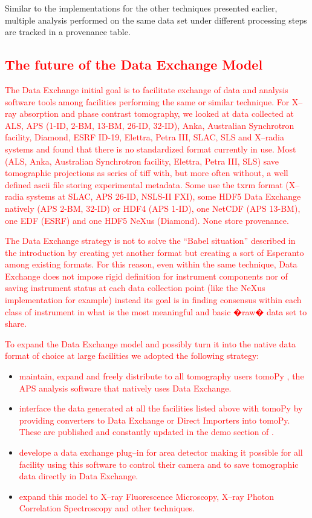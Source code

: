 \documentclass[pdf]{iucr}              %
\begin{document}
Similar to the implementations for the other techniques presented earlier, multiple analysis performed on the same data set under different processing steps are tracked in a provenance table.

\textcolor{red}{\section{The future of the Data Exchange Model}}

\textcolor{red}{The Data Exchange initial goal is to facilitate exchange of data and analysis software tools among facilities performing the same or similar technique. For X--ray absorption and phase contrast tomography, we looked at data collected at ALS, APS (1-ID, 2-BM, 13-BM, 26-ID, 32-ID), Anka, Australian Synchrotron facility, Diamond, ESRF ID-19, Elettra, Petra III, SLAC, SLS and X--radia systems and found that there is no standardized format currently in use. Most (ALS, Anka, Australian Synchrotron facility, Elettra, Petra III, SLS) save tomographic projections as series of tiff with, but more often without, a well defined ascii file storing experimental  metadata.  Some use the txrm format (X--radia systems at SLAC, APS 26-ID, NSLS-II FXI), some HDF5 Data Exchange natively (APS 2-BM, 32-ID) or HDF4 (APS 1-ID), one NetCDF (APS 13-BM), one EDF (ESRF) and one HDF5 NeXus (Diamond). None store provenance.}

\textcolor{red}{The Data Exchange strategy is not to solve the ``Babel situation'' described in the introduction by creating yet another format but creating a sort of Esperanto among existing formats. For this reason, even within the same technique, Data Exchange does not impose rigid definition for instrument components nor of saving instrument status at each data collection point (like the NeXus implementation for example) instead its goal is in finding consensus within each class of instrument in what is the most meaningful and basic �raw� data set to share.}

\textcolor{red}{To expand the Data Exchange model and possibly turn it into the native data format of choice at large facilities we adopted the following strategy:}

\begin{itemize}
\item \textcolor{red}{maintain, expand and freely distribute to all tomography users tomoPy \cite{python_cpp}, the APS analysis software that natively uses Data Exchange.} 
\item \textcolor{red}{interface the data generated at all the facilities listed above with tomoPy by providing converters to Data Exchange or Direct Importers into tomoPy. These are published and constantly updated in the demo section of \cite{data_exchange}.}
\item \textcolor{red}{develope a data exchange plug--in for area detector \cite{area_detector} making it possible for all facility using this software to control their camera and to save tomographic data directly in Data Exchange.}
\item \textcolor{red}{expand this model to X--ray Fluorescence Microscopy, X--ray Photon Correlation Spectroscopy and other techniques.}
\end{itemize}
\end{document}
